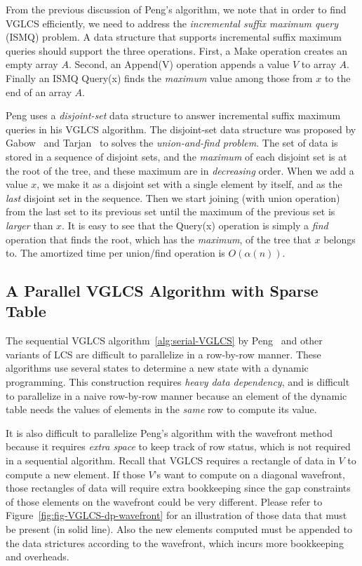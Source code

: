 From the previous discussion of Peng's algorithm, we note that in
order to find VGLCS efficiently, we need to address the {\em
  incremental suffix maximum query} (ISMQ) problem.  A data structure
that supports incremental suffix maximum queries should support the
three operations.  First, a {\sc Make} operation creates an empty
array $A$. Second, an {\sc Append(V)} operation appends a value $V$ to
array $A$. Finally an ISMQ {\sc Query(x)} finds the {\em maximum}
value among those from $x$ to the end of an array $A$.

Peng uses a {\em disjoint-set} data structure to answer incremental
suffix maximum queries in his VGLCS algorithm.  The disjoint-set data
structure was proposed by Gabow~\cite{Gabow1983ALA} and
Tarjan~\cite{Tarjan1975EfficiencyOA} to solves the {\em union-and-find
problem}.  The set of data is stored in a sequence of disjoint sets, and
the {\em maximum} of each disjoint set is at the root of the tree, and
these maximum are in {\em decreasing} order.  When we add a value $x$,
we make it as a disjoint set with a single element by itself, and as the
{\em last} disjoint set in the sequence.  Then we start joining (with
union operation) from the last set to its previous set until the maximum
of the previous set is {\em larger} than $x$. It is easy to see that the
{\sc Query(x)} operation is simply a {\em find} operation that finds the
root, which has the {\em maximum}, of the tree that $x$ belongs to.  The
amortized time per union/find operation is $O(\alpha(n))$.

\subsection{A Parallel VGLCS Algorithm with Sparse Table}

The sequential VGLCS algorithm~\ref{alg:serial-VGLCS} by
Peng~\cite{Peng2011TheLC} and other variants of LCS are difficult to
parallelize in a row-by-row manner.  These algorithms use several
states to determine a new state with a dynamic programming.  This
construction requires {\em heavy data dependency}, and is difficult to
parallelize in a naive row-by-row manner because an element of the
dynamic table needs the values of elements in the {\em same} row to
compute its value.

It is also difficult to parallelize Peng's algorithm with the wavefront
method because it requires {\em extra space} to keep track of row
status, which is not required in a sequential algorithm. Recall that
VGLCS requires a rectangle of data in $V$ to compute a new element.  If
those $V$'s want to compute on a diagonal wavefront, those rectangles
of data will require extra bookkeeping since the gap constraints of
those elements on the wavefront could be very different. Please refer to
Figure~\ref{fig:fig-VGLCS-dp-wavefront} for an illustration of those
data that must be present (in solid line).  Also the new elements
computed must be appended to the data strictures according to the
wavefront, which incurs more bookkeeping and overheads.

